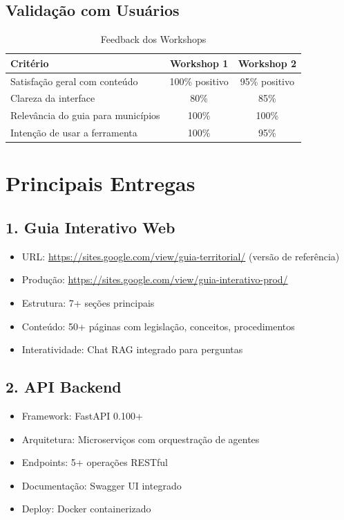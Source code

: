 \documentclass[12pt,a4paper]{report}
\begin{document}
\subsection{Validação com Usuários}

\begin{table}[H]
\centering
\caption{Feedback dos Workshops}
\begin{tabular}{|l|c|c|}
\hline
\textbf{Critério} & \textbf{Workshop 1} & \textbf{Workshop 2} \\
\hline
Satisfação geral com conteúdo & 100\% positivo & 95\% positivo \\
\hline
Clareza da interface & 80\% & 85\% \\
\hline
Relevância do guia para municípios & 100\% & 100\% \\
\hline
Intenção de usar a ferramenta & 100\% & 95\% \\
\hline
\end{tabular}
\end{table}

\section{Principais Entregas}

\subsection{1. Guia Interativo Web}

\begin{itemize}
  \item URL: \url{https://sites.google.com/view/guia-territorial/} (versão de referência)
  \item Produção: \url{https://sites.google.com/view/guia-interativo-prod/}
  \item Estrutura: 7+ seções principais
  \item Conteúdo: 50+ páginas com legislação, conceitos, procedimentos
  \item Interatividade: Chat RAG integrado para perguntas
\end{itemize}

\subsection{2. API Backend}

\begin{itemize}
  \item Framework: FastAPI 0.100+
  \item Arquitetura: Microserviços com orquestração de agentes
  \item Endpoints: 5+ operações RESTful
  \item Documentação: Swagger UI integrado
  \item Deploy: Docker containerizado
\end{itemize}
\end{document}

